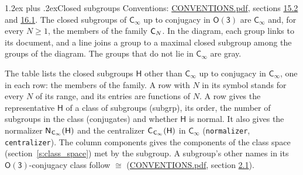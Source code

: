 \documentclass[10pt,a4paper]{article}
\makeatletter
\renewcommand\section{\@startsection{section}{1}{\z@}{-3ex plus -1ex minus -.2ex}%
  {1.2ex plus .2ex}{\normalfont\large\sffamily\bfseries\color{parttitle}}}
\numberwithin{equation}{section}
\newcommand{\grp}[1]{\mathsf{#1}}
\newcommand{\samecls}{\cong}
\newcommand{\hairsp}{\mkern1mu}
\makeatother
\begin{document}
\section{Closed subgroups}\label{s:subgroups}
Conventions: \href{../../CONVENTIONS.pdf}{CONVENTIONS.pdf}, sections \href{../../CONVENTIONS.pdf\#conv.15.2}{15.2} and \href{../../CONVENTIONS.pdf\#conv.16.1}{16.1}.
The closed subgroups of $\grp{C_{\infty}}$ up to conjugacy in \href{O3.pdf}{$\grp{O(3)}$} are $\grp{C_{\infty}}$ and, for every $N \ge 1$, the members of the family $\grp{C_{\mathnormal{N}}}$.
In the diagram, each group links to its document, and a line joins a group to a maximal closed subgroup among the groups of the diagram. The groups that do not lie in $\grp{C_{\infty}}$ are gray.
\begin{center}\end{center}
\leavevmode\label{n:group.H}The table lists the closed subgroups $\grp{H}$ other than $\grp{C_{\infty}}$ up to conjugacy in $\grp{C_{\infty}}$, one in each row: the members of the family. A row with $N$ in its symbol stands for every $N$ of its range, and its entries are functions of $N$. \label{n:head.subgroup}\label{n:head.order}\label{n:head.conjugates}\label{n:head.normal}A row gives the representative $\grp{H}$ of a class of subgroups (subgrp), its order, the number of subgroups in the class (conjugates) and whether $\grp{H}$ is normal. \label{n:group.normalizer}\label{n:group.centralizer}It also gives the normalizer $\grp{N}_{\hairsp \grp{C_{\infty}}}(\grp{H})$ and the centralizer $\grp{C}_{\hairsp \grp{C_{\infty}}}(\grp{H})$ in $\grp{C_{\infty}}$ (\texttt{normalizer}, \texttt{centralizer}). \label{n:head.components}The column components gives the components of the class space (section~\ref{s:class_space}) met by the subgroup. A subgroup's other names in its \href{O3.pdf}{$\grp{O(3)}$}-conjugacy class follow $\samecls$ (\href{../../CONVENTIONS.pdf}{CONVENTIONS.pdf}, section \href{../../CONVENTIONS.pdf\#conv.2.1}{2.1}).
\end{document}
